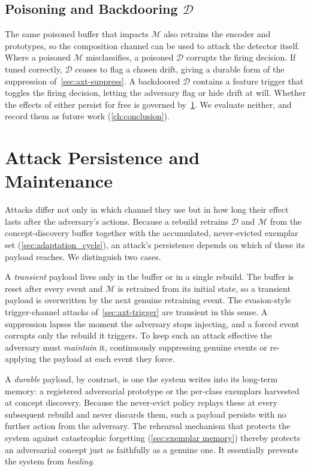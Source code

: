 \subsection{Poisoning and Backdooring \texorpdfstring{$\mathcal{D}$}{D}}
\label{sec:axt-poison-d}
The same poisoned buffer that impacts $\mathcal{M}$ also retrains the encoder and prototypes, so the composition channel can be used to attack the detector itself. Where a poisoned $\mathcal{M}$ misclassifies, a poisoned $\mathcal{D}$ corrupts the firing decision. If tuned correctly, $\mathcal{D}$ ceases to flag a chosen drift, giving a durable form of the suppression of~\cref{sec:axt-suppress}. A backdoored $\mathcal{D}$ contains a feature trigger that toggles the firing decision, letting the adversary flag or hide drift at will. Whether the effects of either persist for free is governed by~\cref{sec:axt-maintenance}. We evaluate neither, and record them as future work (\cref{ch:conclusion}).

\section{Attack Persistence and Maintenance}
\label{sec:axt-maintenance}
Attacks differ not only in which channel they use but in how long their effect lasts after the adversary's actions. Because a rebuild retrains $\mathcal{D}$ and $\mathcal{M}$ from the concept-discovery buffer together with the accumulated, never-evicted exemplar set (\cref{sec:adaptation_cycle}), an attack's persistence depends on which of these its payload reaches. We distinguish two cases.

A \emph{transient} payload lives only in the buffer or in a single rebuild. The buffer is reset after every event and $\mathcal{M}$ is retrained from its initial state, so a transient payload is overwritten by the next genuine retraining event. The evasion-style trigger-channel attacks of~\cref{sec:axt-trigger} are transient in this sense. A suppression lapses the moment the adversary stops injecting, and a forced event corrupts only the rebuild it triggers. To keep such an attack effective the adversary must \emph{maintain} it, continuously suppressing genuine events or re-applying the payload at each event they force.

A \emph{durable} payload, by contrast, is one the system writes into its long-term memory: a registered adversarial prototype or the per-class exemplars harvested at concept discovery. Because the never-evict policy replays these at every subsequent rebuild and never discards them, such a payload persists with no further action from the adversary. The rehearsal mechanism that protects the system against catastrophic forgetting (\cref{sec:exemplar memory}) thereby protects an adversarial concept just as faithfully as a genuine one. It essentially prevents the system from \emph{healing}.


